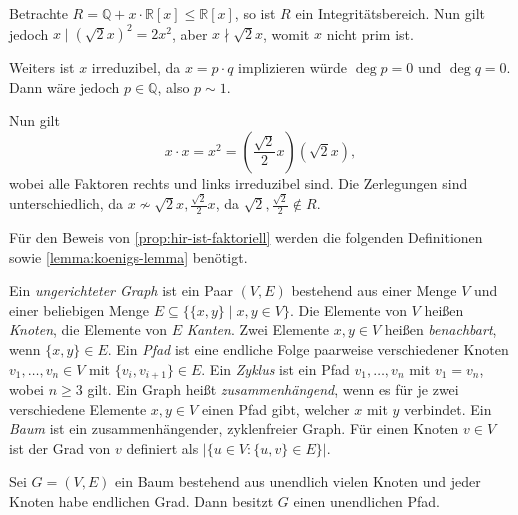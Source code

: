 \begin{example}
    Betrachte $R = \mathbb{Q} + x \cdot \mathbb{R}[x] \leq \mathbb{R}[x]$, so ist $R$ ein Integritätsbereich. Nun gilt jedoch $x \mid (\sqrt{2} x)^2 = 2x^2$, aber $x \nmid \sqrt{2}x$, womit $x$ nicht prim ist.
    
    Weiters ist $x$ irreduzibel, da $x = p \cdot q$ implizieren würde $\deg{p} = 0$ und $\deg{q} = 0$. Dann wäre jedoch $p \in \mathbb{Q}$, also $p \sim 1$.
    
    Nun gilt
    $$ x \cdot x = x^2 = \left(\frac{\sqrt{2}}{2} x\right)(\sqrt{2}x), $$
    wobei alle Faktoren rechts und links irreduzibel sind. Die Zerlegungen sind unterschiedlich, da $x \not\sim \sqrt{2} x, \frac{\sqrt{2}}{2} x$, da $\sqrt{2}, \frac{\sqrt{2}}{2} \notin R$.
\end{example}

Für den Beweis von \cref{prop:hir-ist-faktoriell} werden die folgenden Definitionen sowie \cref{lemma:koenigs-lemma} benötigt.


\begin{definition}
    Ein \emph{ungerichteter Graph} ist ein Paar $(V,E)$ bestehend aus einer Menge $V$ und einer beliebigen Menge $E\subseteq\{\{x,y\}\mid x,y\in V\}$. Die Elemente von $V$ heißen \emph{Knoten}, die Elemente von $E$ \emph{Kanten}. Zwei Elemente $x,y\in V$ heißen \emph{benachbart}, wenn $\{x,y\}\in E$. Ein \emph{Pfad} ist eine endliche Folge paarweise verschiedener Knoten $v_1,\ldots,v_n\in V$ mit $\{v_i,v_{i+1}\}\in E$.
    Ein \emph{Zyklus} ist ein Pfad $v_1,\ldots,v_n$ mit $v_1=v_n$, wobei $n\geq 3$ gilt. Ein Graph heißt \emph{zusammenhängend}, wenn es für je zwei verschiedene Elemente $x,y\in V$ einen Pfad gibt, welcher $x$ mit $y$ verbindet. Ein \emph{Baum} ist ein zusammenhängender, zyklenfreier Graph. Für einen Knoten $v\in V$ ist der Grad von $v$ definiert als $|\{u\in V:\{u,v\}\in E\}|$.
\end{definition}

\begin{lemma}  \label{lemma:koenigs-lemma}
    Sei $G=(V,E)$ ein Baum bestehend aus unendlich vielen Knoten und jeder Knoten habe endlichen Grad. Dann besitzt $G$ einen unendlichen Pfad.
\end{lemma}

